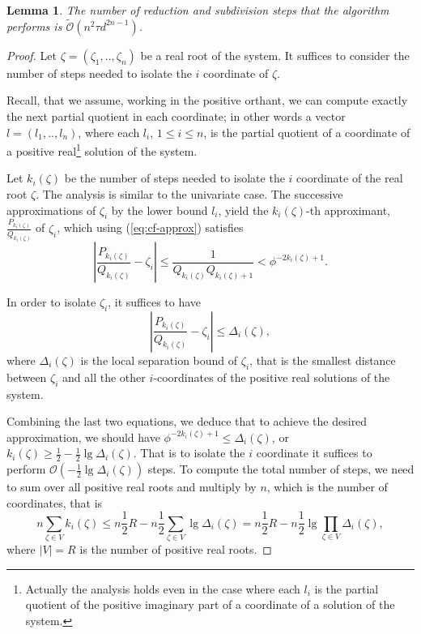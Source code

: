 \documentclass{sig-alternate}
\newtheorem{lemma}[theorem]{Lemma}
\newcommand{\dott}{{..}}
\newcommand{\OO}{\ensuremath{\mathcal{O}}\xspace}
\newcommand{\sO}{\ensuremath{\widetilde{\mathcal{O}}}\xspace}
\begin{document}
\begin{lemma}
  \label{lem:mcf-steps}
  The number of reduction and subdivision steps 
  that the algorithm performs is $\sO( n^2 \tau d^{2 n-1})$.
\end{lemma}
\begin{proof}
  Let $\zeta=(\zeta_{1},\dott, \zeta_{n} )$ be a real root of the system.
  It suffices to consider the number of steps needed to isolate
  the $i$ coordinate of $\zeta$.

  Recall, that we assume, working in the positive orthant, 
  we can compute exactly the next partial quotient in each coordinate;
  in other words a vector $l=(l_1,\dott, l_n)$, where each $l_i$, 
  $1 \leq i \leq n$, is the partial quotient of a coordinate of a positive 
  real\footnote{Actually the analysis holds even in the
  case where each $l_i$ is the partial quotient of the positive imaginary part of
  a coordinate of a solution of the system.} solution of the system.

  Let $k_i(\zeta)$ be the number of steps needed to isolate the
  $i$ coordinate of the real root $\zeta$. 
  The analysis is similar to the univariate case.
  The successive approximations of
  $\zeta_{i}$ by the lower bound $l_i$,
  yield  the $k_i(\zeta)$-th approximant,
  $\frac{P_{k_i(\zeta)}}{Q_{k_i(\zeta)}}$ of $\zeta_i$,
  which using (\ref{eq:cf-approx}) satisfies
  $$
  \left| \frac{P_{k_i(\zeta)}}{Q_{k_i(\zeta)}} - \zeta_{i}  \right|  
  \leq  \frac{1}{Q_{k_i(\zeta)}Q_{k_i(\zeta)+1}}
  <     \phi^{-2k_i(\zeta)+1}.  
  $$

  In order to isolate $\zeta_i$, it suffices to have
  $$
  \left| \frac{P_{k_i(\zeta)}}{Q_{k_i(\zeta)}} - \zeta_{i}  \right| 
  \leq  \Delta_{i}(\zeta),
  $$
  where $\Delta_{i}(\zeta)$ is the local separation bound of $\zeta_i$,
  that is the smallest distance between $\zeta_i$ and all the other
  $i$-coordinates of the positive real solutions of the system.

  Combining the last two equations, we deduce that
  to achieve the desired approximation, we should have 
  $\phi^{-2k_i(\zeta)+1} \leq \Delta_{i}(\zeta)$,
  or  
  $k_i(\zeta)\geq \frac{1}{2} - \frac{1}{2} \lg \Delta_{i}(\zeta)$.
  That is to isolate the $i$ coordinate it suffices to perform 
  $\OO(- \frac{1}{2} \lg \Delta_{i}(\zeta))$ steps.
  To compute the total number of steps, we need to sum over all positive real
  roots and multiply by $n$, which is the number of coordinates,
  that is 
  $$
  n \sum_{\zeta\in V} k_i(\zeta) 
  \leq n \frac{1}{2} R - n \frac{1}{2} \sum_{\zeta\in V} \lg \Delta_{i}(\zeta)  
  = n \frac{1}{2} R - n \frac{1}{2} \lg \prod_{\zeta\in V} \Delta_{i}(\zeta), 
  $$
  where $|V| = R$ is the number of positive real roots.



\end{proof}
\end{document}
